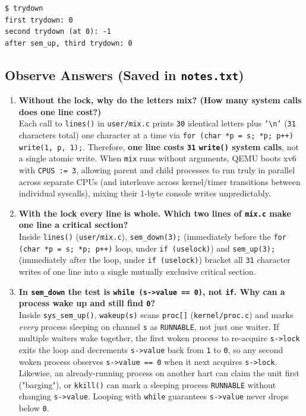\documentclass[12pt,a4paper]{article}
\begin{document}


\begin{lstlisting}[style=consolestyle, caption={Observed QEMU output of optional \texttt{trydown}}]
$ trydown
first trydown: 0
second trydown (at 0): -1
after sem_up, third trydown: 0
\end{lstlisting}

\newpage
\subsection{Observe Answers (Saved in \texttt{notes.txt})}
\begin{enumerate}
    \item \textbf{Without the lock, why do the letters mix? (How many system calls does one line cost?)} \\
    Each call to \texttt{lines()} in \texttt{user/\allowbreak mix.c} prints \texttt{30} identical letters plus \texttt{'\textbackslash n'} (\texttt{31} characters total) one character at a time via \texttt{for (char *p = s; *p; p++) write(1, p, 1);}. Therefore, \textbf{one line costs \texttt{31} \texttt{write()} system calls}, not a single atomic write. When \texttt{mix} runs without arguments, QEMU boots xv6 with \texttt{CPUS := 3}, allowing parent and child processes to run truly in parallel across separate CPUs (and interleave across kernel/timer transitions between individual syscalls), mixing their 1-byte console writes unpredictably.

    \item \textbf{With the lock every line is whole. Which two lines of \texttt{mix.c} make one line a critical section?} \\
    Inside \texttt{lines()} (\texttt{user/\allowbreak mix.c}), \texttt{sem\_\allowbreak down(3);} (immediately before the \texttt{for (char *p = s; *p; p++)} loop, under \texttt{if (uselock)}) and \texttt{sem\_\allowbreak up(3);} (immediately after the loop, under \texttt{if (uselock)}) bracket all \texttt{31} character writes of one line into a single mutually exclusive critical section.

    \item \textbf{In \texttt{sem\_down} the test is \texttt{while (s->value == 0)}, not \texttt{if}. Why can a process wake up and still find \texttt{0}?} \\
    Inside \texttt{sys\_\allowbreak sem\_\allowbreak up()}, \texttt{wakeup(s)} scans \texttt{proc[]} (\texttt{kernel/\allowbreak proc.c}) and marks \emph{every} process sleeping on channel \texttt{s} as \texttt{RUNNABLE}, not just one waiter. If multiple waiters wake together, the first woken process to re-acquire \texttt{s->lock} exits the loop and decrements \texttt{s->value} back from \texttt{1} to \texttt{0}, so any second woken process observes \texttt{s->value == 0} when it next acquires \texttt{s->lock}. Likewise, an already-running process on another hart can claim the unit first ("barging"), or \texttt{kkill()} can mark a sleeping process \texttt{RUNNABLE} without changing \texttt{s->value}. Looping with \texttt{while} guarantees \texttt{s->value} never drops below \texttt{0}.


\end{enumerate}
\end{document}
